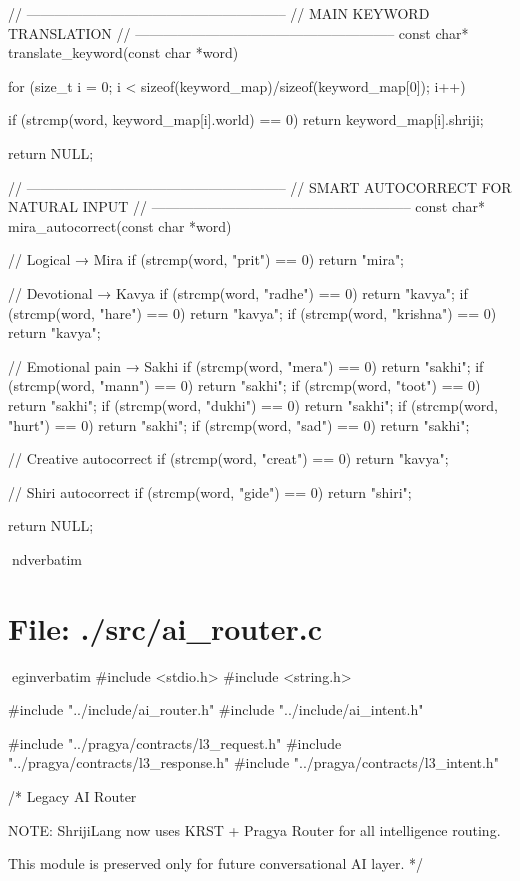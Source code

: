 \documentclass{article}
\begin{document}
// --------------------------------------------------------
// MAIN KEYWORD TRANSLATION
// --------------------------------------------------------
const char* translate_keyword(const char *word) {

for (size_t i = 0; i < sizeof(keyword_map)/sizeof(keyword_map[0]); i++) {

        if (strcmp(word, keyword_map[i].world) == 0)
            return keyword_map[i].shriji;
    }

    return NULL;
}

// --------------------------------------------------------
// SMART AUTOCORRECT FOR NATURAL INPUT
// --------------------------------------------------------
const char* mira_autocorrect(const char *word) {

    // Logical → Mira
    if (strcmp(word, "prit") == 0) return "mira";

    // Devotional → Kavya
    if (strcmp(word, "radhe") == 0) return "kavya";
    if (strcmp(word, "hare") == 0) return "kavya";
    if (strcmp(word, "krishna") == 0) return "kavya";

    // Emotional pain → Sakhi
    if (strcmp(word, "mera") == 0) return "sakhi";
    if (strcmp(word, "mann") == 0) return "sakhi";
    if (strcmp(word, "toot") == 0) return "sakhi";
    if (strcmp(word, "dukhi") == 0) return "sakhi";
    if (strcmp(word, "hurt") == 0) return "sakhi";
    if (strcmp(word, "sad") == 0) return "sakhi";

    // Creative autocorrect
    if (strcmp(word, "creat") == 0) return "kavya";

    // Shiri autocorrect
    if (strcmp(word, "gide") == 0) return "shiri";

    return NULL;
}
nd{verbatim}
\section*{File: ./src/ai_router.c}
egin{verbatim}
#include <stdio.h>
#include <string.h>

#include "../include/ai_router.h"
#include "../include/ai_intent.h"

#include "../pragya/contracts/l3_request.h"
#include "../pragya/contracts/l3_response.h"
#include "../pragya/contracts/l3_intent.h"

/*
   Legacy AI Router

   NOTE:
   ShrijiLang now uses KRST + Pragya Router
   for all intelligence routing.

   This module is preserved only for
   future conversational AI layer.
*/
\end{document}
